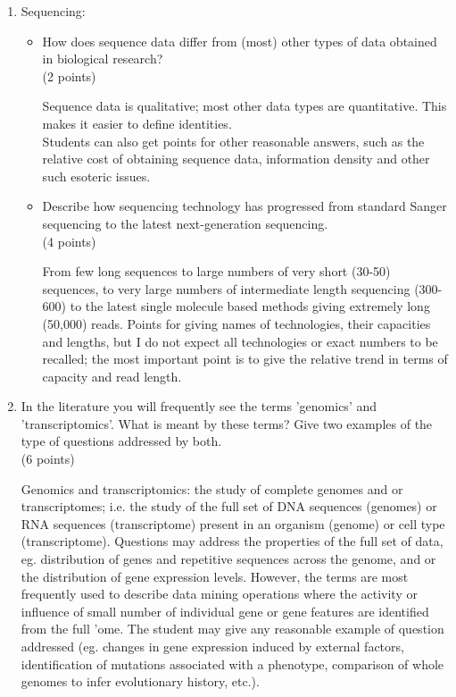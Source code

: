 \documentclass[11pt]{article}
\begin{document}
\begin{enumerate}
\item Sequencing:
  \begin{itemize}
    \item How does sequence data differ from (most) other types of data obtained
      in biological research?\\
      (2 points)\\
\begin{Notes}
  Sequence data is qualitative; most other data types are quantitative. This
  makes it easier to define identities. \\
  Students can also get points for other
  reasonable answers, such as the relative cost of obtaining sequence data,
  information density and other such esoteric issues.
\end{Notes}
    \item Describe how sequencing technology has progressed from standard
      Sanger sequencing to the latest next-generation sequencing.\\
      (4 points)\\
\begin{Notes}
  From few long sequences to large numbers of very short (30-50) sequences, to
  very large numbers of intermediate length sequencing (300-600) to the
  latest single molecule based methods giving extremely long (50,000)
  reads. Points for giving names of technologies, their capacities and
  lengths, but I do not expect all technologies or exact numbers to be
  recalled; the most important point is to give the relative trend in
  terms of capacity and read length.
\end{Notes}
  \end{itemize}
\item In the literature you will frequently see the terms 'genomics' and
  'transcriptomics'. What is meant by these terms? Give two examples of the type
  of questions addressed by both.\\
  (6 points)\\
\begin{Notes}
  Genomics and transcriptomics: the study of complete genomes and or
  transcriptomes; i.e. the study of the full set of DNA sequences (genomes) or
  RNA sequences (transcriptome) present in an organism (genome) or cell type
  (transcriptome). Questions may address the properties of the full set of
  data, eg. distribution of genes and repetitive sequences across the genome,
  and or the distribution of gene expression levels. However, the terms are
  most frequently used to describe data mining operations where the activity
  or influence of small number of individual gene or gene features are
  identified from the full 'ome. The student may give any reasonable example
  of question addressed (eg. changes in gene expression induced by external
  factors, identification of mutations associated with a phenotype, comparison
  of whole genomes to infer evolutionary history, etc.).
\end{Notes}
\end{enumerate}
\end{document}
